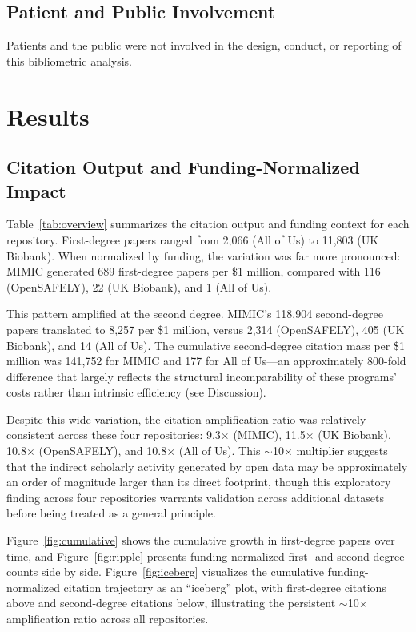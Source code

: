 \documentclass[11pt]{article}
\begin{document}
\subsection{Patient and Public Involvement}

Patients and the public were not involved in the design, conduct, or reporting of this bibliometric analysis.


\section{Results}
\label{sec:results}

\subsection{Citation Output and Funding-Normalized Impact}
\label{sec:results-citations}

Table~\ref{tab:overview} summarizes the citation output and funding context for each repository.
First-degree papers ranged from 2,066 (All of Us) to 11,803 (UK Biobank).
When normalized by funding, the variation was far more pronounced: MIMIC generated 689 first-degree papers per \$1 million, compared with 116 (OpenSAFELY), 22 (UK Biobank), and 1 (All of Us).

This pattern amplified at the second degree.
MIMIC's 118,904 second-degree papers translated to 8,257 per \$1 million, versus 2,314 (OpenSAFELY), 405 (UK Biobank), and 14 (All of Us).
The cumulative second-degree citation mass per \$1 million was 141,752 for MIMIC and 177 for All of Us---an approximately 800-fold difference that largely reflects the structural incomparability of these programs' costs rather than intrinsic efficiency (see Discussion).

Despite this wide variation, the citation amplification ratio was relatively consistent across these four repositories: 9.3$\times$ (MIMIC), 11.5$\times$ (UK Biobank), 10.8$\times$ (OpenSAFELY), and 10.8$\times$ (All of Us).
This ${\sim}$10$\times$ multiplier suggests that the indirect scholarly activity generated by open data may be approximately an order of magnitude larger than its direct footprint, though this exploratory finding across four repositories warrants validation across additional datasets before being treated as a general principle.

Figure~\ref{fig:cumulative} shows the cumulative growth in first-degree papers over time, and Figure~\ref{fig:ripple} presents funding-normalized first- and second-degree counts side by side.
Figure~\ref{fig:iceberg} visualizes the cumulative funding-normalized citation trajectory as an ``iceberg'' plot, with first-degree citations above and second-degree citations below, illustrating the persistent ${\sim}$10$\times$ amplification ratio across all repositories.
\end{document}
